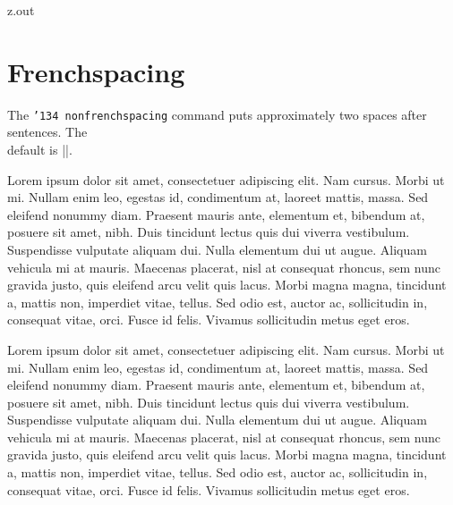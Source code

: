 \MyIO


\begin{VerbatimOut}{z.out}


\section{Frenchspacing}%
\index{\verb+\frenchspacing+}
\index{\verb+\nonfrenchspacing+}

The
\def\t{{\tt\char'134 frenchspacing}}
\def\u{{\tt\char'134 nonfrenchspacing}}
\hbox{\rlap{\t}}%
\hbox{\u}
command puts approximately
\hbox{}%
\hbox{two}
spaces after sentences.
The\\[3pt]
default is |\nonfrenchspacing|.

{\frenchspacing
Lorem ipsum dolor sit amet, consectetuer adipiscing elit. Nam
cursus. Morbi ut mi. Nullam enim leo, egestas id, condimentum at,
laoreet mattis, massa. Sed eleifend nonummy diam. Praesent mauris
ante, elementum et, bibendum at, posuere sit amet, nibh. Duis
tincidunt lectus quis dui viverra vestibulum. Suspendisse
vulputate aliquam dui. Nulla elementum dui ut augue. Aliquam
vehicula mi at mauris. Maecenas placerat, nisl at consequat
rhoncus, sem nunc gravida justo, quis eleifend arcu velit quis
lacus. Morbi magna magna, tincidunt a, mattis non, imperdiet
vitae, tellus. Sed odio est, auctor ac, sollicitudin in,
consequat vitae, orci. Fusce id felis. Vivamus sollicitudin metus
eget eros.\endgraf
}

Lorem ipsum dolor sit amet, consectetuer adipiscing elit. Nam
cursus. Morbi ut mi. Nullam enim leo, egestas id, condimentum at,
laoreet mattis, massa. Sed eleifend nonummy diam. Praesent mauris
ante, elementum et, bibendum at, posuere sit amet, nibh. Duis
tincidunt lectus quis dui viverra vestibulum. Suspendisse
vulputate aliquam dui. Nulla elementum dui ut augue. Aliquam
vehicula mi at mauris. Maecenas placerat, nisl at consequat
rhoncus, sem nunc gravida justo, quis eleifend arcu velit quis
lacus. Morbi magna magna, tincidunt a, mattis non, imperdiet
vitae, tellus. Sed odio est, auctor ac, sollicitudin in,
consequat vitae, orci. Fusce id felis. Vivamus sollicitudin metus
eget eros.
\end{VerbatimOut}

\MyIO


